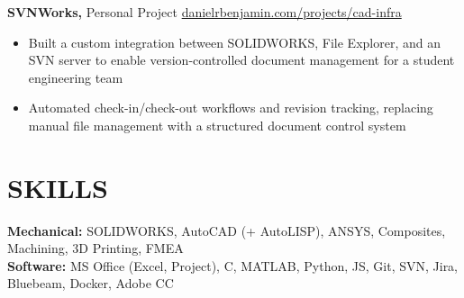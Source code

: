 \documentclass[11pt]{article}       %
\begin{document}
\textbf{SVNWorks,} {Personal Project} \hfill \href{https://www.danielrbenjamin.com/projects/cad-infra/}{danielrbenjamin.com/projects/cad-infra} \\
\vspace{-8.5pt}
\begin{itemize}
  \item Built a custom integration between SOLIDWORKS, File Explorer, and an SVN server to enable version-controlled document management for a student engineering team
  \item Automated check-in/check-out workflows and revision tracking, replacing manual file management with a structured document control system
\end{itemize}

\section*{SKILLS}
\textbf{Mechanical:} SOLIDWORKS, AutoCAD (+ AutoLISP), ANSYS, Composites, Machining, 3D Printing, FMEA\\
\textbf{Software:} MS Office (Excel, Project), C, MATLAB, Python, JS, Git, SVN, Jira, Bluebeam, Docker, Adobe CC

\end{document}
